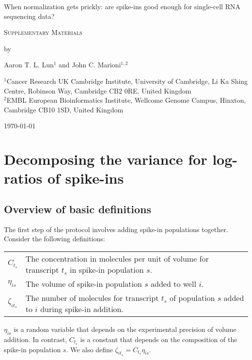 \documentclass{article}
\begin{document}
\begin{titlepage}
\vspace*{3cm}
\begin{center}

{\LARGE
When normalization gets prickly: are spike-ins good enough for single-cell RNA sequencing data?
\par}

\vspace{0.75cm}

{\Large 
    \textsc{Supplementary Materials}
\par
}
\vspace{0.75cm}

\large
by


\vspace{0.75cm}
Aaron T. L. Lun$^{1}$ and John C. Marioni$^{1,2}$

\vspace{1cm}
\begin{minipage}{0.9\textwidth}
\begin{flushleft} 
$^1$Cancer Research UK Cambridge Institute, University of Cambridge, Li Ka Shing Centre, Robinson Way, Cambridge CB2 0RE, United Kingdom \\[6pt]
$^2$EMBL European Bioinformatics Institute, Wellcome Genome Campus, Hinxton, Cambridge CB10 1SD, United Kingdom \\[6pt]
\end{flushleft}
\end{minipage}

\vspace{1.5cm}
{\large \today{}}

\vspace*{\fill}
\end{center}
\end{titlepage}

\section{Decomposing the variance for log-ratios of spike-ins}

\subsection{Overview of basic definitions}
The first step of the protocol involves adding spike-in populations together.
Consider the following definitions:
\begin{center}
    \begin{tabular}{l p{}}
$C_{t_s}$  & The concentration in molecules per unit of volume for transcript $t_s$ in spike-in population $s$. \\
$\eta_{is}$   & The volume of spike-in population $s$ added to well $i$. \\
$\zeta_{it_s}$ & The number of molecules for transcript $t_s$ of population $s$ added to $i$ during spike-in addition.
\end{tabular}
\end{center}
$\eta_{is}$ is a random variable that depends on the experimental precision of volume addition.
In contrast, $C_{t_s}$ is a constant that depends on the composition of the spike-in population $s$.
We also define $\zeta_{it_s} = C_{t_s}\eta_{is}$.
\end{document}
